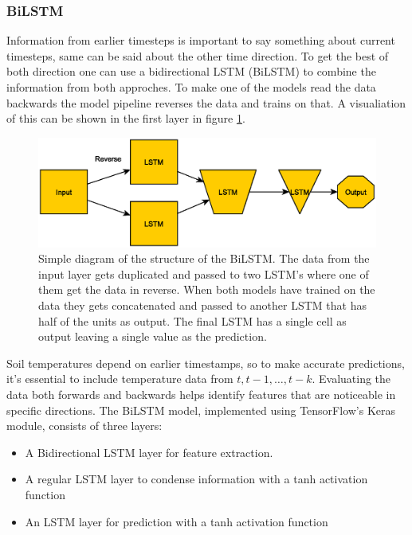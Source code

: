\subsubsection{BiLSTM}

Information from earlier timesteps is important to say something about current timesteps, same can be said about the other time direction. To get the best of both direction one can use a bidirectional LSTM (BiLSTM) to combine the information from both approches. To make one of the models read the data backwards the model pipeline reverses the data and trains on that. A visualiation of this can be shown in the first layer in figure \ref{fig:bilstm}.

\begin{figure}[H]
	\centering
	\includegraphics[width=0.7\linewidth]{figures/BiLSTM}
	\caption[BiLSTM overview]{Simple diagram of the structure of the BiLSTM. The data from the input layer gets duplicated and passed to two LSTM's where one of them get the data in reverse. When both models have trained on the data they gets concatenated and passed to another LSTM that has half of the units as output. The final LSTM has a single cell as output leaving a single value as the prediction.}
	\label{fig:bilstm}
\end{figure}

Soil temperatures depend on earlier timestamps, so to make accurate predictions, it's essential to include temperature data from $t, t-1, \dots, t-k$. Evaluating the data both forwards and backwards helps identify features that are noticeable in specific directions. The BiLSTM model, implemented using TensorFlow's Keras module, consists of three layers:

\begin{itemize}
	\item A Bidirectional LSTM layer for feature extraction.
	\item A regular LSTM layer to condense information with a tanh activation function
	\item An LSTM layer for prediction with a tanh activation function
\end{itemize}

